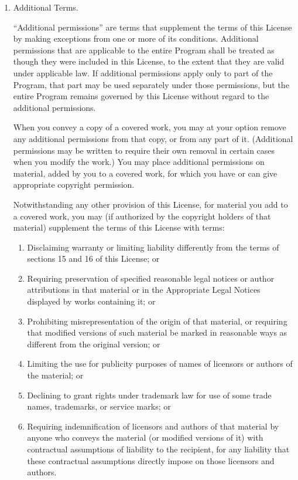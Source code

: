 \documentclass[11pt]{article}
\begin{document}
\begin{enumerate}
\item Additional Terms.

``Additional permissions'' are terms that supplement the terms of this
License by making exceptions from one or more of its conditions.
Additional permissions that are applicable to the entire Program shall
be treated as though they were included in this License, to the extent
that they are valid under applicable law.  If additional permissions
apply only to part of the Program, that part may be used separately
under those permissions, but the entire Program remains governed by
this License without regard to the additional permissions.

When you convey a copy of a covered work, you may at your option
remove any additional permissions from that copy, or from any part of
it.  (Additional permissions may be written to require their own
removal in certain cases when you modify the work.)  You may place
additional permissions on material, added by you to a covered work,
for which you have or can give appropriate copyright permission.

Notwithstanding any other provision of this License, for material you
add to a covered work, you may (if authorized by the copyright holders of
that material) supplement the terms of this License with terms:
  \begin{enumerate}
  \item Disclaiming warranty or limiting liability differently from the
  terms of sections 15 and 16 of this License; or

  \item Requiring preservation of specified reasonable legal notices or
  author attributions in that material or in the Appropriate Legal
  Notices displayed by works containing it; or

  \item Prohibiting misrepresentation of the origin of that material, or
  requiring that modified versions of such material be marked in
  reasonable ways as different from the original version; or

  \item Limiting the use for publicity purposes of names of licensors or
  authors of the material; or

  \item Declining to grant rights under trademark law for use of some
  trade names, trademarks, or service marks; or

  \item Requiring indemnification of licensors and authors of that
  material by anyone who conveys the material (or modified versions of
  it) with contractual assumptions of liability to the recipient, for
  any liability that these contractual assumptions directly impose on
  those licensors and authors.
  \end{enumerate}


\end{enumerate}
\end{document}
